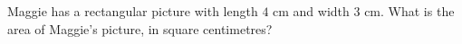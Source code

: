 Maggie has a rectangular picture with length $4$ cm and width $3$ cm. What is the area of Maggie's picture, in square centimetres?
